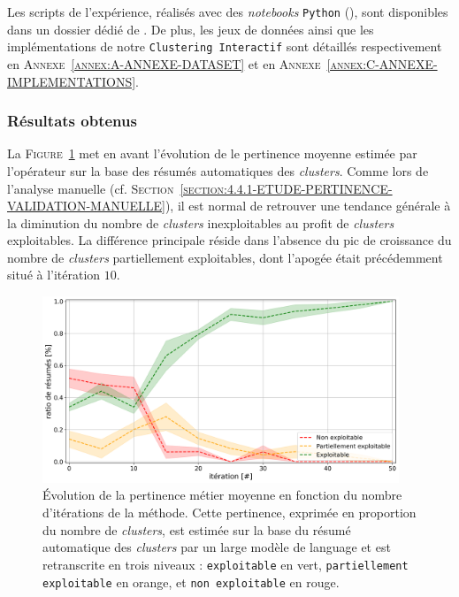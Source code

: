 			\begin{leftBarInformation}
				Les scripts de l'expérience, réalisés avec des \textit{notebooks} \texttt{Python} (\cite{van-rossum-drake:2009:python-reference-manual}), sont disponibles dans un dossier dédié de \cite{schild:2021:cognitivefactory-interactiveclusteringcomparativestudy}.
				De plus, les jeux de données ainsi que les implémentations de notre \texttt{Clustering Interactif} sont détaillés respectivement en \textsc{Annexe~\ref{annex:A-ANNEXE-DATASET}} et en \textsc{Annexe~\ref{annex:C-ANNEXE-IMPLEMENTATIONS}}.
			\end{leftBarInformation}


		\subsubsection{Résultats obtenus}
		
			La \textsc{Figure~\ref{figure:4.4.3-ETUDE-PERTINENCE-RESUME-AUTOMATIQUE}} met en avant l'évolution de le pertinence moyenne estimée par l'opérateur
			sur la base des résumés automatiques des \textit{clusters}.
			Comme lors de l'analyse manuelle (cf. \textsc{Section~\ref{section:4.4.1-ETUDE-PERTINENCE-VALIDATION-MANUELLE}}), il est normal de retrouver une tendance générale à la diminution du nombre de \textit{clusters} inexploitables au profit de \textit{clusters} exploitables.
			La différence principale réside dans l'absence du pic de croissance du nombre de \textit{clusters} partiellement exploitables, dont l'apogée était précédemment situé à l'itération $10$.
			
			\begin{figure}[!htb]
				\centering
				\includegraphics[width=0.95\textwidth]{figures/etude-pertinence-llm-check-resume-annotation-favori}
				\caption{
					Évolution de la pertinence métier moyenne en fonction du nombre d'itérations de la méthode.
					Cette pertinence, exprimée en proportion du nombre de \textit{clusters}, est estimée sur la base du résumé automatique des \textit{clusters} par un large modèle de language et est retranscrite en trois niveaux : \texttt{exploitable} en vert, \texttt{partiellement exploitable} en orange, et \texttt{non exploitable} en rouge.
				}
				\label{figure:4.4.3-ETUDE-PERTINENCE-RESUME-AUTOMATIQUE}
			\end{figure}
			
